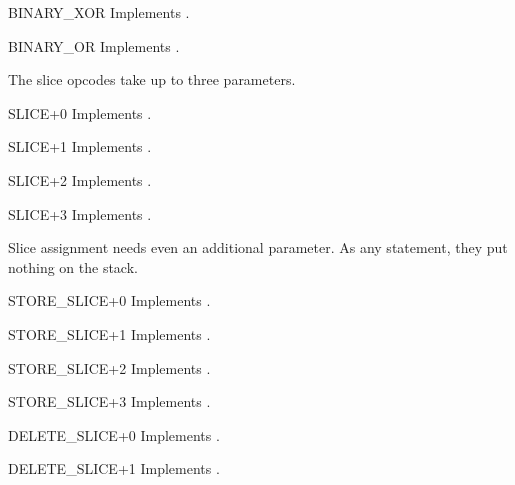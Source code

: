 \begin{opcodedesc}{BINARY_XOR}{}
Implements .
\end{opcodedesc}

\begin{opcodedesc}{BINARY_OR}{}
Implements .
\end{opcodedesc}

The slice opcodes take up to three parameters.

\begin{opcodedesc}{SLICE+0}{}
Implements .
\end{opcodedesc}

\begin{opcodedesc}{SLICE+1}{}
Implements .
\end{opcodedesc}

\begin{opcodedesc}{SLICE+2}{}
Implements .
\end{opcodedesc}

\begin{opcodedesc}{SLICE+3}{}
Implements .
\end{opcodedesc}

Slice assignment needs even an additional parameter.  As any statement,
they put nothing on the stack.

\begin{opcodedesc}{STORE_SLICE+0}{}
Implements .
\end{opcodedesc}

\begin{opcodedesc}{STORE_SLICE+1}{}
Implements .
\end{opcodedesc}

\begin{opcodedesc}{STORE_SLICE+2}{}
Implements .
\end{opcodedesc}

\begin{opcodedesc}{STORE_SLICE+3}{}
Implements .
\end{opcodedesc}

\begin{opcodedesc}{DELETE_SLICE+0}{}
Implements .
\end{opcodedesc}

\begin{opcodedesc}{DELETE_SLICE+1}{}
Implements .
\end{opcodedesc}

